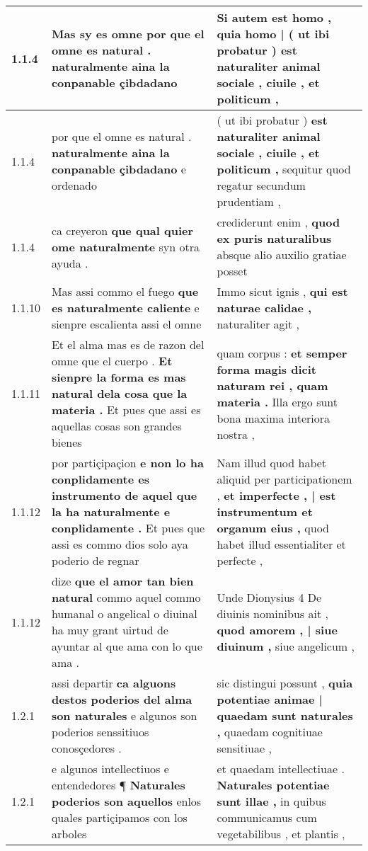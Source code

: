\begin{tabular}{|p{1cm}|p{6.5cm}|p{6.5cm}|}
1.1.4 & Mas sy es omne \textbf{ por que el omne es natural . } naturalmente aina la conpanable çibdadano & Si autem est homo , \textbf{ quia homo | ( ut ibi probatur ) } est naturaliter animal sociale , ciuile , et politicum , \\\hline
1.1.4 & por que el omne es natural . \textbf{ naturalmente aina la conpanable çibdadano } e ordenado & ( ut ibi probatur ) \textbf{ est naturaliter animal sociale , ciuile , et politicum , } sequitur quod regatur secundum prudentiam , \\\hline
1.1.4 & ca creyeron \textbf{ que qual quier ome naturalmente } syn otra ayuda . & crediderunt enim , \textbf{ quod ex puris naturalibus } absque alio auxilio gratiae posset \\\hline
1.1.10 & Mas assi commo el fuego \textbf{ que es naturalmente caliente } e sienpre escalienta assi el omne & Immo sicut ignis , \textbf{ qui est naturae calidae , } naturaliter agit , \\\hline
1.1.11 & Et el alma mas es de razon del omne que el cuerpo . \textbf{ Et sienpre la forma es mas natural dela cosa que la materia . } Et pues que assi es aquellas cosas son grandes bienes & quam corpus : \textbf{ et semper forma magis dicit naturam rei , quam materia . } Illa ergo sunt bona maxima interiora nostra , \\\hline
1.1.12 & por partiçipaçion \textbf{ e non lo ha conplidamente es instrumento de aquel que la ha naturalmente e conplidamente . } Et pues que assi es commo dios solo aya poderio de regnar & Nam illud quod habet aliquid per participationem , \textbf{ et imperfecte , | est instrumentum et organum eius , } quod habet illud essentialiter et perfecte , \\\hline
1.1.12 & dize \textbf{ que el amor tan bien natural } commo aquel commo humanal o angelical o diuinal ha muy grant uirtud de ayuntar al que ama con lo que ama . & Unde Dionysius 4 De diuinis nominibus ait , \textbf{ quod amorem , | siue diuinum , } siue angelicum , \\\hline
1.2.1 & assi departir \textbf{ ca alguons destos poderios del alma son naturales } e algunos son poderios senssitiuos conosçedores . & sic distingui possunt , \textbf{ quia potentiae animae | quaedam sunt naturales , } quaedam cognitiuae sensitiuae , \\\hline
1.2.1 & e algunos intellectiuos e entendedores ¶ \textbf{ Naturales poderios son aquellos } enlos quales partiçipamos con los arboles & et quaedam intellectiuae . \textbf{ Naturales potentiae sunt illae , } in quibus communicamus cum vegetabilibus , et plantis , \\\hline

\end{tabular}
